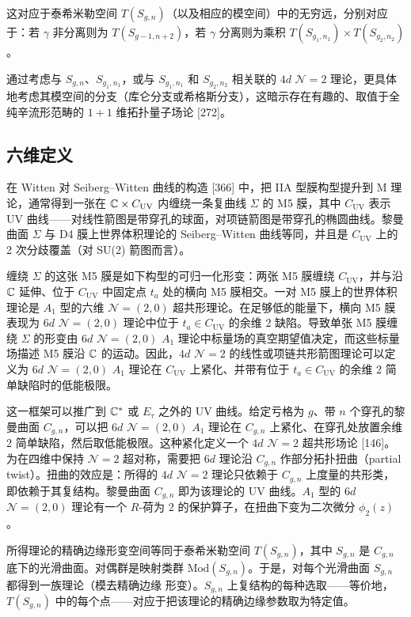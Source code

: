 这对应于泰希米勒空间 $T(S_{g,n})$（以及相应的模空间）中的无穷远，分别对应于：若 $\gamma$ 非分离则为 $T(S_{g-1,n+2})$，若 $\gamma$ 分离则为乘积 $T(S_{g_1,n_1})\times T(S_{g_2,n_2})$。

通过考虑与 $S_{g,n}$、$S_{g_1,n_1}$，或与 $S_{g_1,n_1}$ 和 $S_{g_2,n_2}$ 相关联的 $4d$ $\mathcal{N}=2$ 理论，更具体地考虑其模空间的分支（库仑分支或希格斯分支），这暗示存在有趣的、取值于全纯辛流形范畴的 $1+1$ 维拓扑量子场论 [272]。

\subsection{六维定义}

在 Witten 对 Seiberg–Witten 曲线的构造 [366] 中，把 IIA 型膜构型提升到 M 理论，通常得到一张在 $\mathbb{C}\times C_{\mathrm{UV}}$ 内缠绕一条复曲线 $\Sigma$ 的 M5 膜，其中 $C_{\mathrm{UV}}$ 表示 UV 曲线——对线性箭图是带穿孔的球面，对项链箭图是带穿孔的椭圆曲线。黎曼曲面 $\Sigma$ 与 D4 膜上世界体积理论的 Seiberg–Witten 曲线等同，并且是 $C_{\mathrm{UV}}$ 上的 2 次分歧覆盖（对 SU(2) 箭图而言）。

缠绕 $\Sigma$ 的这张 M5 膜是如下构型的可归一化形变：两张 M5 膜缠绕 $C_{\mathrm{UV}}$，并与沿 $\mathbb{C}$ 延伸、位于 $C_{\mathrm{UV}}$ 中固定点 $t_a$ 处的横向 M5 膜相交。一对 M5 膜上的世界体积理论是 $A_1$ 型的六维 $\mathcal{N}=(2,0)$ 超共形理论。在足够低的能量下，横向 M5 膜表现为 $6d$ $\mathcal{N}=(2,0)$ 理论中位于 $t_a\in C_{\mathrm{UV}}$ 的余维 2 缺陷。导致单张 M5 膜缠绕 $\Sigma$ 的形变由 $6d$ $\mathcal{N}=(2,0)$ $A_1$ 理论中标量场的真空期望值决定，而这些标量场描述 M5 膜沿 $\mathbb{C}$ 的运动。因此，$4d$ $\mathcal{N}=2$ 的线性或项链共形箭图理论可以定义为 $6d$ $\mathcal{N}=(2,0)$ $A_1$ 理论在 $C_{\mathrm{UV}}$ 上紧化、并带有位于 $t_a\in C_{\mathrm{UV}}$ 的余维 2 简单缺陷时的低能极限。

这一框架可以推广到 $\mathbb{C}^*$ 或 $E_\tau$ 之外的 UV 曲线。给定亏格为 $g$、带 $n$ 个穿孔的黎曼曲面 $C_{g,n}$，可以把 $6d$ $\mathcal{N}=(2,0)$ $A_1$ 理论在 $C_{g,n}$ 上紧化、在穿孔处放置余维 2 简单缺陷，然后取低能极限。这种紧化定义一个 $4d$ $\mathcal{N}=2$ 超共形场论 [146]。为在四维中保持 $\mathcal{N}=2$ 超对称，需要把 $6d$ 理论沿 $C_{g,n}$ 作部分拓扑扭曲（partial twist）。扭曲的效应是：所得的 $4d$ $\mathcal{N}=2$ 理论只依赖于 $C_{g,n}$ 上度量的共形类，即依赖于其复结构。黎曼曲面 $C_{g,n}$ 即为该理论的 UV 曲线。$A_1$ 型的 $6d$ $\mathcal{N}=(2,0)$ 理论有一个 $R$-荷为 2 的保护算子，在扭曲下变为二次微分 $\phi_2(z)$。

所得理论的精确边缘形变空间等同于泰希米勒空间 $T(S_{g,n})$，其中 $S_{g,n}$ 是 $C_{g,n}$ 底下的光滑曲面。对偶群是映射类群 $\mathrm{Mod}(S_{g,n})$。于是，对每个光滑曲面 $S_{g,n}$ 都得到一族理论（模去精确边缘
形变）。$S_{g,n}$ 上复结构的每种选取——等价地，$T(S_{g,n})$ 中的每个点——对应于把该理论的精确边缘参数取为特定值。

